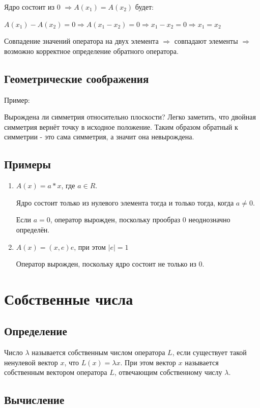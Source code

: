 \documentclass[12pt]{article}
\begin{document}
Ядро состоит из 0 $\Rightarrow A(x_1) = A(x_2)$ будет:

$A(x_1) - A(x_2) = 0 \Rightarrow A(x_1 - x_2) = 0 \Rightarrow x_1 - x_2 = 0 \Rightarrow x_1 = x_2$

Совпадение значений оператора на двух элемента $\Rightarrow$ совпадают элементы $\Rightarrow$ возможно корректное определение обратного оператора.

\subsection{Геометрические соображения}
Пример:

Вырождена ли симметрия относительно плоскости? Легко заметить, что двойная симметрия вернёт точку в исходное положение. Таким образом обратный к симметрии - это сама симметрия, а значит она невырождена.

\subsection{Примеры}
\begin{enumerate}
    \item $A(x) = a * x$, где $a \in R$.

          Ядро состоит только из нулевого элемента тогда и только тогда, когда $a \neq 0$.

          Если $a = 0$, оператор вырожден, поскольку прообраз 0 неоднозначно определён.

    \item $A(x) = (x,e)e$, при этом $|e| = 1$

          Оператор вырожден, поскольку ядро состоит не только из 0.
\end{enumerate}

\section{Собственные числа}
\subsection{Определение}
Число $\lambda$ называется собственным числом оператора $L$, если существует такой ненулевой вектор $x$, что $L(x) = \lambda x$. При этом вектор $x$ называется собственным вектором оператора $L$, отвечающим собственному числу $\lambda$.

\subsection{Вычисление}
\end{document}
